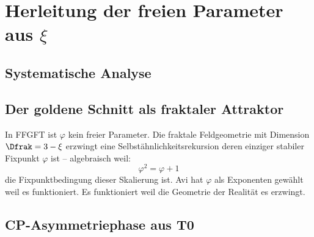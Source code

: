 \section{Herleitung der freien Parameter aus $\xi$}

\subsection{Systematische Analyse}

\begin{center}
\end{center}

\subsection{Der goldene Schnitt als fraktaler Attraktor}

In FFGFT ist $\varphi$ kein freier Parameter. Die fraktale Feldgeometrie mit Dimension $\Dfrak = 3 - \xi$ erzwingt eine Selbstähnlichkeitsrekursion deren einziger stabiler Fixpunkt $\varphi$ ist -- algebraisch weil:
\begin{equation}
  \varphi^2 = \varphi + 1
\end{equation}
die Fixpunktbedingung dieser Skalierung ist. Avi hat $\varphi$ als Exponenten gewählt weil es funktioniert. Es funktioniert weil die Geometrie der Realität es erzwingt.

\subsection{CP-Asymmetriephase aus T0}

